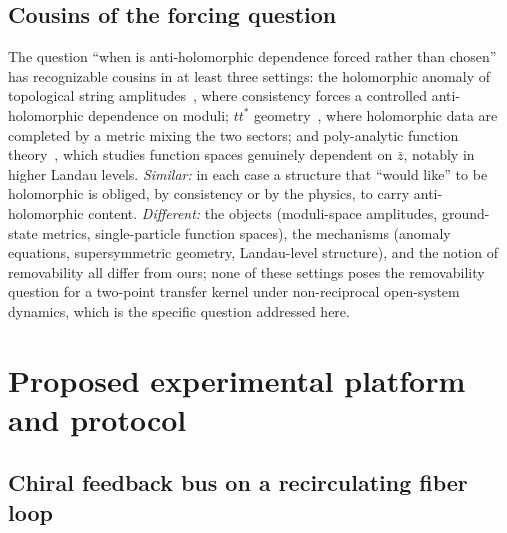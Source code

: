 \documentclass[11pt,a4paper]{article}
\newcommand{\zb}{\bar{z}}
\begin{document}
\subsection{Cousins of the forcing question}

The question ``when is anti-holomorphic dependence forced rather than chosen''
has recognizable cousins in at least three settings: the holomorphic anomaly of
topological string amplitudes~\cite{BCOV1994}, where consistency forces a
controlled anti-holomorphic dependence on moduli; $tt^*$
geometry~\cite{CecottiVafa1991}, where holomorphic data are completed by a
metric mixing the two sectors; and poly-analytic function
theory~\cite{Vasilevski2000,Abreu2010,AbreuFeichtinger2014}, which studies
function spaces genuinely dependent on $\zb$, notably in higher Landau levels.
\emph{Similar:} in each case a structure that ``would like'' to be holomorphic
is obliged, by consistency or by the physics, to carry anti-holomorphic
content. \emph{Different:} the objects (moduli-space amplitudes, ground-state
metrics, single-particle function spaces), the mechanisms (anomaly equations,
supersymmetric geometry, Landau-level structure), and the notion of
removability all differ from ours; none of these settings poses the
removability question for a two-point transfer kernel under non-reciprocal
open-system dynamics, which is the specific question addressed here.

\section{Proposed experimental platform and protocol}
\label{sec:platform}

\subsection{Chiral feedback bus on a recirculating fiber loop}
\end{document}
